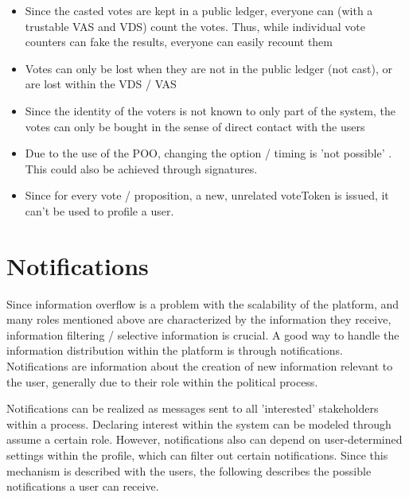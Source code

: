 \begin{itemize}
\item Since the casted votes are kept in a public ledger, everyone can (with a trustable VAS and VDS) count the votes. Thus, while individual vote counters can fake the results, everyone can easily recount them
\item Votes can only be lost when they are not in the public ledger (not cast), or are lost within the VDS / VAS
\item Since the identity of the voters is not known to only part of the system, the votes can only be bought in the sense of direct contact with the users
\item Due to the use of the POO, changing the option / timing is 'not possible' . This could also be achieved through signatures.
\item Since for every vote / proposition, a new, unrelated voteToken is issued, it can't be used to profile a user.
\end{itemize}


\section{Notifications}
\label{sec:Notifications}
Since information overflow is a problem with the scalability of the platform, and many roles mentioned above are characterized by the information they receive, information filtering / selective information is crucial. A good way to handle the information distribution within the platform is through notifications. Notifications are information about the creation of new information relevant to the user, generally due to their role within the political process.

Notifications can be realized as messages sent to all 'interested' stakeholders within a process. Declaring interest within the system can be modeled through assume a certain role. However, notifications also can depend on user-determined settings within the profile, which can filter out certain notifications. Since this mechanism is described with the users, the following describes the possible notifications a user can receive.

